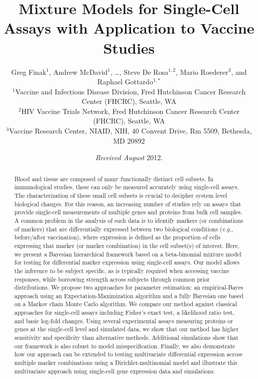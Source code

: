 \documentclass[useAMS,referee,usenatbib]{biom}
\title[MIMOSA: Mixture Models for Single-Cell Assays]{Mixture Models for Single-Cell Assays with Application to Vaccine Studies}
\author{Greg Finak$^{1}$, Andrew McDavid$^{1}$, \ldots, Steve De Rosa$^{1,2}$, Mario Roederer$^{3}$, and Raphael Gottardo$^{1,*}$\email{rgottard@fhcrc.org}\\
$^{1}$Vaccine and Infectious Disease Division, Fred Hutchinson Cancer Research Center (FHCRC), Seattle, WA\\
$^{2}$HIV Vaccine Trials Network, Fred Hutchinson Cancer Research Center (FHCRC), Seattle, WA\\
$^{3}$Vaccine Research Center, NIAID, NIH, 40 Convent Drive, Rm 5509, Bethesda, MD 20892}
\begin{document}
\date{{\it Received August} 2012.}

\pagerange{\pageref{firstpage}-\pageref{lastpage}} 
\volume{ }
\pubyear{ }
\artmonth{ }


\label{firstpage}

\begin{abstract}
Blood and tissue are composed of many functionally distinct cell subsets. In immunological studies, these can only be measured accurately using single-cell assays. The characterization of these small cell subsets is crucial to decipher system level biological changes. For this reason, an increasing number of studies rely on assays that provide single-cell measurements of multiple genes and proteins from bulk cell samples. A common problem in the analysis of such data is to identify markers (or combinations of markers) that are differentially expressed between two biological conditions (\textit{e.g.}, before/after vaccination), where expression is defined as the proportion of cells expressing that marker (or marker combination) in the cell subset(s) of interest.
Here, we present a Bayesian hierarchical framework based on a beta-binomial mixture model for testing for differential marker expression using single-cell assays. Our model allows the inference to be subject specific, as is typically required when accessing vaccine responses, while borrowing strength across subjects through common prior distributions. We propose two approaches for parameter estimation: an empirical-Bayes approach using an Expectation-Maximization algorithm and a fully Bayesian one based on a Markov chain Monte Carlo algorithm. We compare our method against classical approaches for single-cell assays including Fisher's exact test, a likelihood ratio test, and basic log-fold changes. Using several experimental assays measuring proteins or genes at the single-cell level and simulated data, we show that our method has higher sensitivity and specificity than alternative methods. Additional simulations show that our framework is also robust to model misspecification. Finally, we also demonstrate how our approach can be extended to testing multivariate differential expression across multiple marker combinations using a Dirichlet-multinomial model and illustrate this multivariate approach using single-cell gene expression data and simulations.
\end{abstract}
\end{document}

